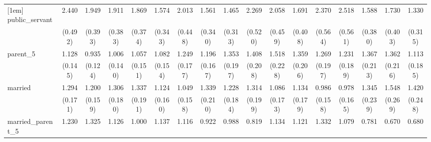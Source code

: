 {\begin{tabular}{l*{16}{c}}
[1em]
public\_servant      &       2.440\sym{***}&       1.949\sym{***}&       1.911\sym{**} &       1.869\sym{**} &       1.574\sym{*}  &       2.013\sym{**} &       1.561\sym{*}  &       1.465         &       2.269\sym{***}&       2.058\sym{**} &       1.691\sym{*}  &       2.370\sym{***}&       2.518\sym{***}&       1.588         &       1.730\sym{*}  &       1.330         \\
                    &     (0.492)         &     (0.393)         &     (0.383)         &     (0.374)         &     (0.343)         &     (0.448)         &     (0.340)         &     (0.313)         &     (0.520)         &     (0.459)         &     (0.408)         &     (0.564)         &     (0.561)         &     (0.380)         &     (0.403)         &     (0.315)         \\
[1em]
parent\_5            &       1.128         &       0.935         &       1.006         &       1.057         &       1.082         &       1.249         &       1.196         &       1.353\sym{*}  &       1.408\sym{*}  &       1.518\sym{**} &       1.359\sym{*}  &       1.269         &       1.231         &       1.367\sym{*}  &       1.362         &       1.113         \\
                    &     (0.145)         &     (0.124)         &     (0.140)         &     (0.151)         &     (0.154)         &     (0.177)         &     (0.167)         &     (0.197)         &     (0.208)         &     (0.228)         &     (0.206)         &     (0.197)         &     (0.189)         &     (0.213)         &     (0.216)         &     (0.185)         \\
[1em]
married             &       1.294         &       1.200         &       1.306         &       1.337\sym{*}  &       1.124         &       1.049         &       1.339         &       1.228         &       1.314         &       1.086         &       1.134         &       0.986         &       0.978         &       1.345         &       1.548\sym{*}  &       1.420\sym{*}  \\
                    &     (0.171)         &     (0.159)         &     (0.180)         &     (0.191)         &     (0.160)         &     (0.158)         &     (0.210)         &     (0.184)         &     (0.199)         &     (0.173)         &     (0.179)         &     (0.158)         &     (0.165)         &     (0.239)         &     (0.269)         &     (0.248)         \\
[1em]
married\_parent\_5    &       1.230         &       1.325         &       1.126         &       1.000         &       1.137         &       1.116         &       0.922         &       0.988         &       0.819         &       1.134         &       1.121         &       1.332         &       1.079         &       0.781         &       0.670         &       0.680         \\

\end{tabular}}
